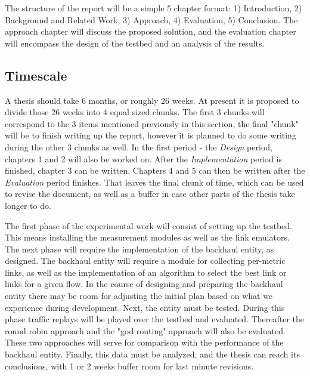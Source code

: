 The structure of the report will be a simple 5 chapter format: 1) Introduction, 2) Background and Related Work, 3) Approach, 4) Evaluation, 5) Conclusion. The approach chapter will discuss the proposed solution, and the evaluation chapter will encompass the design of the testbed and an analysis of the results.

\subsection{Timescale}

A thesis should take 6 months, or roughly 26 weeks. At present it is proposed to divide those 26 weeks into 4 equal sized chunks. The first 3 chunks will correspond to the 3 items mentioned previously in this section, the final "chunk" will be to finish writing up the report, however it is planned to do some writing during the other 3 chunks as well. In the first period - the \textit{Design} period, chapters 1 and 2 will also be worked on. After the \textit{Implementation} period is finished, chapter 3 can be written. Chapters 4 and 5 can then be written after the \textit{Evaluation} period finishes. That leaves the final chunk of time, which can be used to revise the document, as well as a buffer in case other parts of the thesis take longer to do.

The first phase of the experimental work will consist of setting up the testbed. This means installing the measurement modules as well as the link emulators. The next phase will require the implementation of the backhaul entity, as designed. The backhaul entity will require a module for collecting per-metric links, as well as the implementation of an algorithm to select the best link or links for a given flow. In the course of designing and preparing the backhaul entity there may be room for adjusting the initial plan based on what we experience during development. Next, the entity must be tested. During this phase traffic replays will be played over the testbed and evaluated. Thereafter the round robin approach and the "god routing" approach will also be evaluated. These two approaches will serve for comparison with the performance of the backhaul entity. Finally, this data must be analyzed, and the thesis can reach its conclusions, with 1 or 2 weeks buffer room for last minute revisions.


